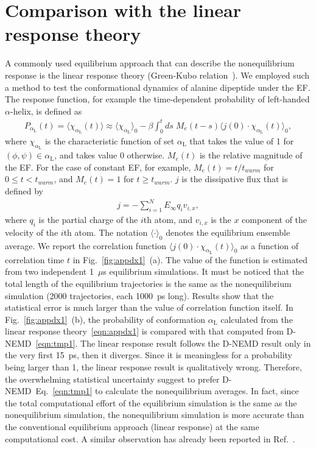 \documentclass[journal=jctcce,manuscript=manuscript]{achemso}
\newcommand{\confc}[0]{{\alpha_{\textrm{L}}}}
\begin{document}
  \appendix
\section{Comparison with the linear response theory}  
A commonly used equilibrium approach that can describe the nonequilibrium
response is the linear response theory (Green-Kubo relation~\cite{green1954markoff,kubo1957statistical}).
We employed such a method to test the
conformational dynamics of alanine dipeptide under the EF.
The response function, for example the time-dependent probability of
left-handed $\alpha$-helix, is defined as~\cite{tuckeman2010statistical}
\begin{align}\label{eqn:appdx1}
  P_\confc(t) = \langle\chi_{\confc}(t)\rangle \approx \langle \chi_{\confc} \rangle_0 -
  \beta \int_0^t ds\; M_e(t - s)\langle j(0)\cdot \chi_{\confc}(t) \rangle_0,
\end{align}
where $\chi_{\confc}$ is the characteristic function of set $\confc$ that takes
the value of 1 for $(\phi,\psi)\in \confc$, and takes value 0
otherwise. $M_e(t)$ is the relative magnitude of the EF. For the case of
constant EF, for example, $M_e(t) = t/t_{warm}$ for $0\leq t<t_{warm}$, and
$M_e(t) = 1$ for $t\geq t_{warm}$.
$j$ is the dissipative flux that is defined by
\begin{align}
  j = - \sum_{i=1}^N E_\infty q_i v_{i,x},
\end{align}
where $q_i$ is the partial charge of the $i$th atom, and $v_{i,x}$ is
the $x$ component of the velocity of the $i$th atom.  The notation
$\langle\cdot\rangle_0$ denotes the equilibrium ensemble average.
We report the correlation function
$\langle j(0)\cdot \chi_{\confc}(t) \rangle_0$ as a function of correlation time $t$
in Fig.~\ref{fig:appdx1}~(a). The value of the function is estimated from
two independent 1~$\mu$s equilibrium simulations.
It must be noticed that the total length of the equilibrium
trajectories is the same as the nonequilibrium simulation (2000
trajectories, each 1000~ps long).
Results show that the statistical error is much larger than the value of
correlation function itself.
  In Fig.~\ref{fig:appdx1}~(b),
  the probability of conformation $\confc$ calculated from
  the linear response theory~\eqref{eqn:appdx1} is compared with that
  computed from D-NEMD~\eqref{eqn:tmp1}.
  The linear response result follows the D-NEMD result only in the very first
  15~ps, then it diverges. Since it is meaningless for a probability
  being larger than 1, the linear response result is qualitatively wrong.
Therefore, the
overwhelming statistical uncertainty suggest to prefer
D-NEMD~Eq.~\eqref{eqn:tmp1} to calculate the
nonequilibrium averages. 
In fact, since the total computational effort of
the equilibrium simulation is the same as the nonequilibrium
simulation, the nonequilibrium simulation is more
accurate than the conventional equilibrium approach (linear response) at the same computational cost.
A similar
observation has already been reported in Ref.~\cite{ciccotti1975direct}.
\end{document}
